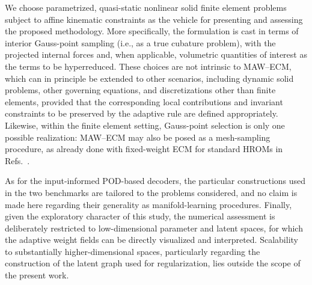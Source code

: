 \documentclass[preprint,10pt]{elsarticle}  %
\begin{document}


We choose parametrized, quasi-static nonlinear solid finite element
problems subject to affine kinematic constraints as the vehicle for
presenting and assessing the proposed methodology. More specifically, the
formulation is cast in terms of interior Gauss-point sampling (i.e., as a
true cubature problem), with the projected internal forces and, when
applicable, volumetric quantities of interest as the terms to be
hyperreduced. These choices are not intrinsic to MAW--ECM, which can in
principle be extended to other scenarios, including dynamic solid
problems, other governing equations, and discretizations other than
finite elements, provided that the corresponding local contributions and
invariant constraints to be preserved by the adaptive rule are defined
appropriately. Likewise, within the finite element setting, Gauss-point
selection is only one possible realization: MAW--ECM may also be posed as
a mesh-sampling procedure, as already done with fixed-weight ECM for
standard HROMs in Refs.~\cite{ares2023hyper,bravo2024geometrically}.

As for the input-informed POD-based decoders, the particular
constructions used in the two benchmarks are tailored to the problems
considered, and no claim is made here regarding their generality as
manifold-learning procedures. Finally, given the exploratory character of this study, the numerical
assessment is deliberately restricted to low-dimensional parameter and
latent spaces, for which the adaptive weight fields  can be directly visualized and interpreted.
Scalability to substantially higher-dimensional spaces, particularly
regarding the construction of the latent graph used for regularization, lies
outside the scope of the present work.
\end{document}
